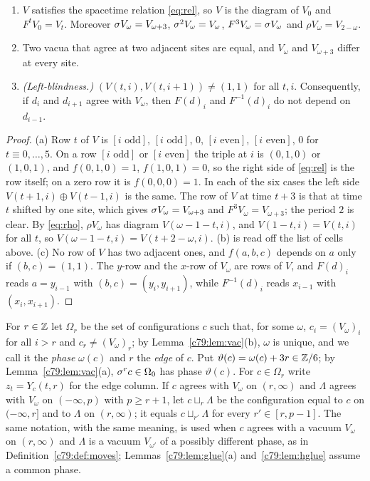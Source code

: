 \begin{lemma}[vacuum]\label{c79:lem:vac}
\begin{enumerate}
\item[(a)] $V$ satisfies the spacetime relation \eqref{eq:rel}, so $V$ is the diagram of $V_0$ and $F^tV_0=V_t$. Moreover $\sigma V_\omega=V_{\omega+3}$, $\sigma^2V_\omega=V_\omega$, $F^3V_\omega=\sigma V_\omega$ and $\rho V_\omega=V_{2-\omega}$.
\item[(b)] Two vacua that agree at two adjacent sites are equal, and $V_\omega$ and $V_{\omega+3}$ differ at every site.
\item[(c)] \emph{(Left-blindness.)} $(V(t,i),V(t,i+1))\ne(1,1)$ for all $t,i$. Consequently, if $d_{i}$ and $d_{i+1}$ agree with $V_\omega$, then $F(d)_i$ and $F^{-1}(d)_i$ do not depend on $d_{i-1}$.
\end{enumerate}
\end{lemma}

\begin{proof}
(a) Row $t$ of $V$ is $[i\text{ odd}]$, $[i\text{ odd}]$, $0$, $[i\text{ even}]$, $[i\text{ even}]$, $0$ for $t\equiv0,\dots,5$. On a row $[i\text{ odd}]$ or $[i\text{ even}]$ the triple at $i$ is $(0,1,0)$ or $(1,0,1)$, and $f(0,1,0)=1$, $f(1,0,1)=0$, so the right side of \eqref{eq:rel} is the row itself; on a zero row it is $f(0,0,0)=1$. In each of the six cases the left side $V(t+1,i)\oplus V(t-1,i)$ is the same. The row of $V$ at time $t+3$ is that at time $t$ shifted by one site, which gives $\sigma V_\omega=V_{\omega+3}$ and $F^3V_\omega=V_{\omega+3}$; the period $2$ is clear. By \eqref{eq:rho}, $\rho V_\omega$ has diagram $V(\omega-1-t,i)$, and $V(1-t,i)=V(t,i)$ for all $t$, so $V(\omega-1-t,i)=V(t+2-\omega,i)$. (b) is read off the list of cells above. (c) No row of $V$ has two adjacent ones, and $f(a,b,c)$ depends on $a$ only if $(b,c)=(1,1)$. The $y$-row and the $x$-row of $V_\omega$ are rows of $V$, and $F(d)_i$ reads $a=y_{i-1}$ with $(b,c)=(y_i,y_{i+1})$, while $F^{-1}(d)_i$ reads $x_{i-1}$ with $(x_i,x_{i+1})$.
\end{proof}

For $r\in\mathbb{Z}$ let $\Omega_r$ be the set of configurations $c$ such that, for some $\omega$, $c_i=(V_\omega)_i$ for all $i>r$ and $c_r\ne(V_\omega)_r$; by Lemma~\ref{c79:lem:vac}(b), $\omega$ is unique, and we call it the \emph{phase} $\omega(c)$ and $r$ the \emph{edge} of $c$. Put $\vartheta(c)=\omega(c)+3r\in\mathbb{Z}/6$; by Lemma~\ref{c79:lem:vac}(a), $\sigma^rc\in\Omega_0$ has phase $\vartheta(c)$. For $c\in\Omega_r$ write $z_t=Y_c(t,r)$ for the edge column. If $c$ agrees with $V_\omega$ on $(r,\infty)$ and $\Lambda$ agrees with $V_\omega$ on $(-\infty,p)$ with $p\ge r+1$, let $c\sqcup_r\Lambda$ be the configuration equal to $c$ on $(-\infty,r]$ and to $\Lambda$ on $(r,\infty)$; it equals $c\sqcup_{r'}\Lambda$ for every $r'\in[r,p-1]$. The same notation, with the same meaning, is used when $c$ agrees with a vacuum $V_\omega$ on $(r,\infty)$ and $\Lambda$ is a vacuum $V_{\omega'}$ of a possibly different phase, as in Definition~\ref{c79:def:moves}; Lemmas~\ref{c79:lem:glue}(a) and~\ref{c79:lem:hglue} assume a common phase.

